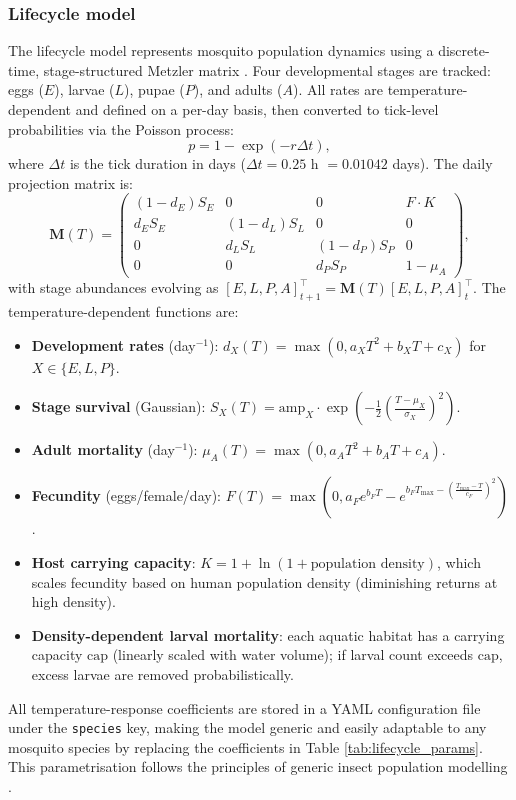 \documentclass{article}
\begin{document}
\subsubsection{Lifecycle model}
\label{sec:lifecycle}
The lifecycle model represents mosquito population dynamics using a discrete-time, stage-structured Metzler matrix 
\citep{2023.ST.ASR,2025.KM.WTR}. Four developmental stages are tracked: eggs ($E$), larvae ($L$), pupae ($P$), and adults ($A$). 
All rates are temperature-dependent and defined on a per-day basis, then converted to tick-level probabilities via the Poisson 
process:
\[
p = 1 - \exp(-r \Delta t),
\]
where $\Delta t$ is the tick duration in days ($\Delta t = 0.25$ h $= 0.01042$ days). 
The daily projection matrix is:
\[
\mathbf{M}(T) = 
\begin{pmatrix}
(1 - d_E) S_E & 0 & 0 & F \cdot K \\
d_E S_E & (1 - d_L) S_L & 0 & 0 \\
0 & d_L S_L & (1 - d_P) S_P & 0 \\
0 & 0 & d_P S_P & 1 - \mu_A
\end{pmatrix},
\]
with stage abundances evolving as $[E,L,P,A]_{t+1}^\top = \mathbf{M}(T) [E,L,P,A]_t^\top$. The temperature-dependent functions are:
\begin{itemize}
  \item \textbf{Development rates} (day$^{-1}$): $d_X(T) = \max(0, a_X T^2 + b_X T + c_X)$ for $X \in \{E,L,P\}$.
  \item \textbf{Stage survival} (Gaussian): $S_X(T) = \text{amp}_X \cdot \exp\left(-\frac{1}{2}\left(\frac{T - \mu_X}{\sigma_X}\right)^2\right)$.
  \item \textbf{Adult mortality} (day$^{-1}$): $\mu_A(T) = \max(0, a_A T^2 + b_A T + c_A)$.
  \item \textbf{Fecundity} (eggs/female/day): $F(T) = \max\left(0, a_F e^{b_F T} - e^{b_F T_{\max} - \left(\frac{T_{\max}-T}{c_F}\right)^2}\right)$.
  \item \textbf{Host carrying capacity}: $K = 1 + \ln(1 + \text{population density})$, which scales fecundity based on human population 
  density (diminishing returns at high density).
  \item \textbf{Density-dependent larval mortality}: each aquatic habitat has a carrying capacity $\text{cap}$ (linearly scaled with water 
  volume); if larval count exceeds $\text{cap}$, excess larvae are removed probabilistically.
\end{itemize}
All temperature-response coefficients are stored in a YAML configuration file under the \texttt{species} key, making the model generic 
and easily adaptable to any mosquito species by replacing the coefficients in Table \ref{tab:lifecycle_params}. This parametrisation 
follows the principles of generic insect population modelling \citep{2025.KM.DPF,2025.KM.WTR,2026.KM.THM}.
\end{document}

